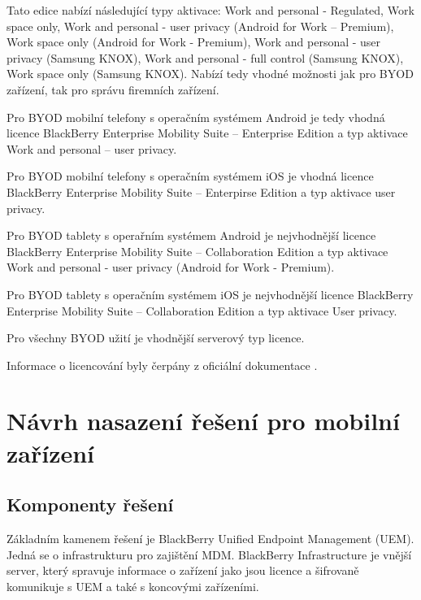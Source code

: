 Tato edice nabízí následující typy aktivace: Work and personal - Regulated, Work space only, Work and personal - user privacy (Android for Work -- Premium), Work space only (Android for Work - Premium), Work and personal - user privacy (Samsung KNOX), Work and personal - full control (Samsung KNOX), Work space only (Samsung KNOX). Nabízí tedy vhodné možnosti jak pro BYOD zařízení, tak pro správu firemních zařízení. 

Pro BYOD mobilní telefony s operačním systémem Android je tedy vhodná licence BlackBerry Enterprise Mobility Suite -- Enterprise Edition a typ aktivace Work and personal -- user privacy.

Pro BYOD mobilní telefony s operačním systémem iOS je vhodná licence BlackBerry Enterprise Mobility Suite -- Enterpirse Edition a typ aktivace user privacy.

Pro BYOD tablety s operařním systémem Android je nejvhodnější licence BlackBerry Enterprise Mobility Suite -- Collaboration Edition a typ aktivace Work and personal - user privacy (Android for Work - Premium).

Pro BYOD tablety s operačním systémem iOS je nejvhodnější licence BlackBerry Enterprise Mobility Suite -- Collaboration Edition a typ aktivace User privacy.

Pro všechny BYOD užití je vhodnější serverový typ licence.

Informace o licencování byly čerpány z oficiální dokumentace .


\section{Návrh nasazení řešení pro mobilní zařízení}

\subsection{Komponenty řešení}


Základním kamenem řešení je BlackBerry Unified Endpoint Management (UEM). Jedná se o infrastrukturu pro zajištění MDM. BlackBerry Infrastructure je vnější server, který spravuje informace o zařízení jako jsou licence a šifrovaně komunikuje s UEM a také s koncovými zařízeními.

